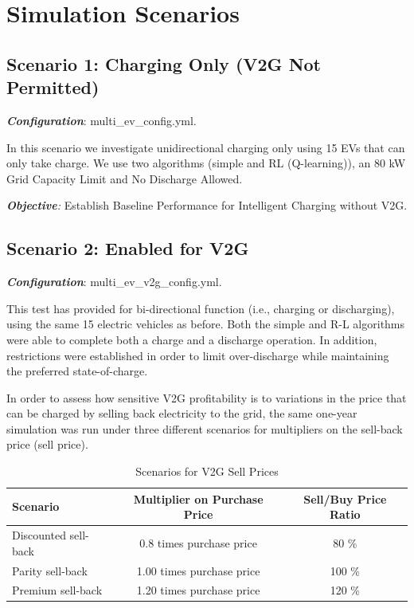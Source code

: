 \section{Simulation Scenarios}\label{sec:scenarios}

\subsection{Scenario 1: Charging Only (V2G Not Permitted)}\label{subsec:scenario_charge_only}

\textit{\textbf{Configuration}}: multi\_ev\_config.yml.

In this scenario we investigate unidirectional charging only using 15 EVs that can only take charge. We use two algorithms (simple and RL (Q-learning)), an 80 kW Grid Capacity Limit and No Discharge Allowed.

\textit{\textbf{Objective}:} Establish Baseline Performance for Intelligent Charging without V2G.

\subsection{Scenario 2: Enabled for V2G}\label{subsec:scenario_v2g}

\textit{\textbf{Configuration}}: multi\_ev\_v2g\_config.yml.

This test has provided for bi-directional function (i.e., charging or discharging), using the same 15 electric vehicles as before. Both the simple and R-L algorithms were able to complete both a charge and a discharge operation. In addition, restrictions were established in order to limit over-discharge while maintaining the preferred state-of-charge.

In order to assess how sensitive V2G profitability is to variations in the price that can be charged by selling back electricity to the grid, the same one-year simulation was run under three different scenarios for multipliers on the sell-back price (sell price).

\begin{table}[H] 
\centering 
\caption{Scenarios for V2G Sell Prices} 
\label{tab:v2g_sell_price_scenarios} 
\begin{tabular}{@{}lcc@{}} 
\hline 
\textbf{Scenario} & \textbf{Multiplier on Purchase Price} & \textbf{Sell/Buy Price Ratio}\\ 
\hline 
Discounted sell-back & 0.8 times purchase price & 80 \% \\ 
Parity sell-back & 1.00 times purchase price & 100 \% \\ 
Premium sell-back & 1.20 times purchase price & 120 \% \\ 
\hline 
\end{tabular} 
\end{table}

